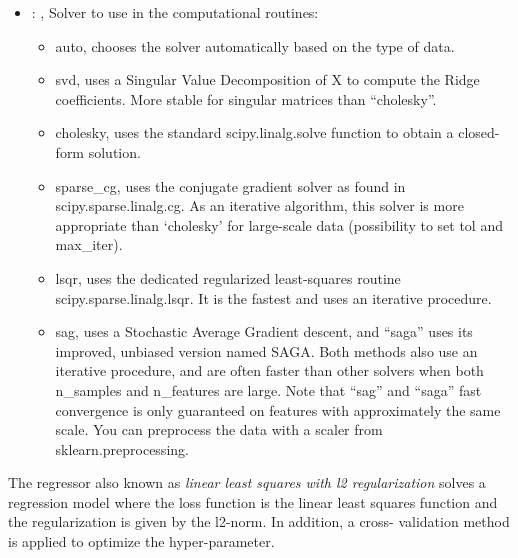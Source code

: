\begin{itemize}
    \item {}: , 
      Solver to use in the computational routines:
      \begin{itemize}                                                    \item auto, chooses the
      solver automatically based on the type of data.
      \item svd, uses a Singular Value Decomposition of X to compute the Ridge coefficients. More
      stable for singular                                                                matrices
      than ``cholesky''.                                                    \item cholesky, uses the
      standard scipy.linalg.solve function to obtain a closed-form solution.
      \item sparse\_cg, uses the conjugate gradient solver as found in scipy.sparse.linalg.cg. As an
      iterative algorithm,                                                               this solver
      is more appropriate than ‘cholesky’ for large-scale data (possibility to set tol and
      max\_iter).                                                    \item lsqr, uses the dedicated
      regularized least-squares routine scipy.sparse.linalg.lsqr. It is the fastest and uses
      an iterative procedure.                                                    \item sag, uses a
      Stochastic Average Gradient descent, and ``saga'' uses its improved, unbiased version named
      SAGA.                                                               Both methods also use an
      iterative procedure, and are often faster than other solvers when both
      n\_samples and n\_features are large. Note that ``sag'' and ``saga'' fast convergence is only
      guaranteed on                                                               features with
      approximately the same scale. You can preprocess the data with a scaler from
      sklearn.preprocessing.                                                  \end{itemize}
  \end{itemize}
 The  regressor also known as                              \textit{linear least
 squares with l2 regularization} solves a regression                              model where the
 loss function is the linear least squares function and the
 regularization is given by the l2-norm.                              In addition, a cross-
 validation method is applied to optimize the hyper-parameter.

